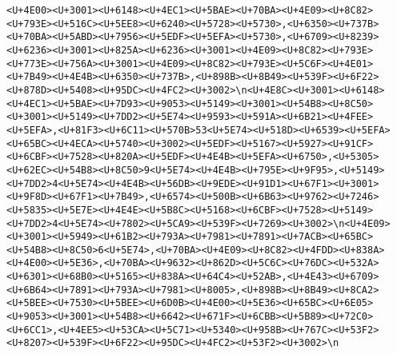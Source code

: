 \documentclass[
]{article}
\begin{document}
\begin{verbatim}
<U+4E00><U+3001><U+6148><U+4EC1><U+5BAE><U+70BA><U+4E09><U+8C82><U+793E><U+516C><U+5EE8><U+6240><U+5728><U+5730>,<U+6350><U+737B><U+70BA><U+5ABD><U+7956><U+5EDF><U+5EFA><U+5730>,<U+6709><U+8239><U+6236><U+3001><U+825A><U+6236><U+3001><U+4E09><U+8C82><U+793E><U+773E><U+756A><U+3001><U+4E09><U+8C82><U+793E><U+5C6F><U+4E01><U+7B49><U+4E4B><U+6350><U+737B>,<U+898B><U+8B49><U+539F><U+6F22><U+878D><U+5408><U+95DC><U+4FC2><U+3002>\n<U+4E8C><U+3001><U+6148><U+4EC1><U+5BAE><U+7D93><U+9053><U+5149><U+3001><U+54B8><U+8C50><U+3001><U+5149><U+7DD2><U+5E74><U+9593><U+591A><U+6B21><U+4FEE><U+5EFA>,<U+81F3><U+6C11><U+570B>53<U+5E74><U+518D><U+6539><U+5EFA><U+65BC><U+4ECA><U+5740><U+3002><U+5EDF><U+5167><U+5927><U+91CF><U+6CBF><U+7528><U+820A><U+5EDF><U+4E4B><U+5EFA><U+6750>,<U+5305><U+62EC><U+54B8><U+8C50>9<U+5E74><U+4E4B><U+795E><U+9F95>,<U+5149><U+7DD2>4<U+5E74><U+4E4B><U+56DB><U+9EDE><U+91D1><U+67F1><U+3001><U+9F8D><U+67F1><U+7B49>,<U+6574><U+500B><U+6B63><U+9762><U+7246><U+5835><U+5E7E><U+4E4E><U+5B8C><U+5168><U+6CBF><U+7528><U+5149><U+7DD2>4<U+5E74><U+7802><U+5CA9><U+539F><U+7269><U+3002>\n<U+4E09><U+3001><U+5949><U+61B2><U+793A><U+7981><U+7891><U+7ACB><U+65BC><U+54B8><U+8C50>6<U+5E74>,<U+70BA><U+4E09><U+8C82><U+4FDD><U+838A><U+4E00><U+5E36>,<U+70BA><U+9632><U+862D><U+5C6C><U+76DC><U+532A><U+6301><U+68B0><U+5165><U+838A><U+64C4><U+52AB>,<U+4E43><U+6709><U+6B64><U+7891><U+793A><U+7981><U+8005>,<U+898B><U+8B49><U+8CA2><U+5BEE><U+7530><U+5BEE><U+6D0B><U+4E00><U+5E36><U+65BC><U+6E05><U+9053><U+3001><U+54B8><U+6642><U+671F><U+6CBB><U+5B89><U+72C0><U+6CC1>,<U+4EE5><U+53CA><U+5C71><U+5340><U+958B><U+767C><U+53F2><U+8207><U+539F><U+6F22><U+95DC><U+4FC2><U+53F2><U+3002>\n

\end{verbatim}
\end{document}
